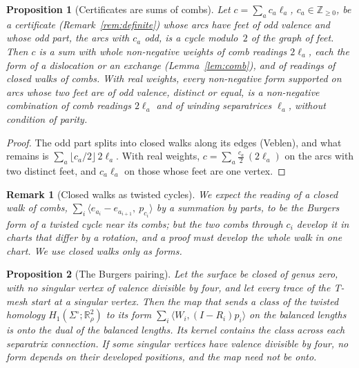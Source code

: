 \documentclass[11pt,a4paper]{article}
\newtheorem{proposition}{Proposition}
\newtheorem{remark}{Remark}
\newcommand{\Z}{\mathbb{Z}}
\newcommand{\R}{\mathbb{R}}
\begin{document}
\begin{proposition}[Certificates are sums of combs]\label{thm:combs}
Let $c = \sum_a c_a\ell_a$, $c_a \in \Z_{\ge0}$, be a certificate
(Remark~\ref{rem:definite}) whose arcs have feet of odd valence and whose odd
part, the arcs with $c_a$ odd, is a cycle modulo~$2$ of the graph of feet.
Then $c$ is a sum with whole non-negative weights of comb readings $2\ell_a$,
each the form of a dislocation or an exchange (Lemma~\ref{lem:comb}), and of
readings of closed walks of combs. With real weights, every non-negative form
supported on arcs whose two feet are of odd valence, distinct or equal, is a
non-negative combination of comb readings $2\ell_a$ and of winding separatrices
$\ell_a$, without condition of parity.
\end{proposition}

\begin{proof}
The odd part splits into closed walks along its edges (Veblen), and what
remains is $\sum_a \lfloor c_a/2 \rfloor\,2\ell_a$. With real weights, $c =
\sum_a \tfrac{c_a}{2}\,(2\ell_a)$ on the arcs with two distinct feet, and
$c_a\ell_a$ on those whose feet are one vertex.
\end{proof}

\begin{remark}[Closed walks as twisted cycles]
We expect the reading of a closed walk of combs, $\sum_i \langle e_{a_i} -
e_{a_{i+1}},\ p_{c_i}\rangle$ by a summation by parts, to be the Burgers form
of a twisted cycle near its combs; but the two combs through $c_i$ develop it
in charts that differ by a rotation, and a proof must develop the whole walk
in one chart. We use closed walks only as forms.
\end{remark}

\begin{proposition}[The Burgers pairing]\label{prop:pairing}
Let the surface be closed of genus zero, with no singular vertex of valence
divisible by four, and let every trace of the T-mesh start at a singular
vertex. Then the map that sends a class of the twisted homology
$H_1(\Sigma^\circ; \R^2_\rho)$ to its form $\sum_i \langle W_i, (I - R_i)p_i
\rangle$ on the balanced lengths is onto the dual of the balanced lengths. Its
kernel contains the class across each separatrix connection. If some singular
vertices have valence divisible by four, no form depends on their developed
positions, and the map need not be onto.
\end{proposition}
\end{document}
